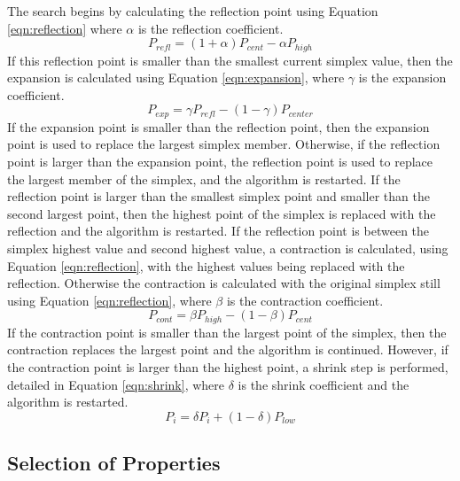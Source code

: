 \documentclass[pdflatex,sn-mathphys]{sn-jnl}
\begin{document}
	The search begins by calculating the reflection point using Equation \ref{eqn:reflection} where $\alpha$ is the reflection coefficient.
		\begin{equation}\label{eqn:reflection}
			P_{refl} = (1 + \alpha) P_{cent} - \alpha P_{high}
		\end{equation}
	If this reflection point is smaller than the smallest current simplex value, then the expansion is calculated using Equation \ref{eqn:expansion}, where $\gamma$ is the expansion coefficient.
		\begin{equation}\label{eqn:expansion}
			P_{exp} = \gamma P_{refl} - (1 - \gamma) P_{center}
		\end{equation}
	If the expansion point is smaller than the reflection point, then the expansion point is used to replace the largest simplex member.  Otherwise, if the reflection point is larger than the expansion point, the reflection point is used to replace the largest member of the simplex, and the algorithm is restarted.
	If the reflection point is larger than the smallest simplex point and smaller than the second largest point, then the highest point of the simplex is replaced with the reflection and the algorithm is restarted. 
	If the reflection point is between the simplex highest value and second highest value, a contraction is calculated, using Equation \ref{eqn:reflection}, with the highest values being replaced with the reflection.  Otherwise the contraction is calculated with the original simplex still using Equation \ref{eqn:reflection}, where $\beta$ is the contraction coefficient.
		\begin{equation}\label{eqn:contraction}
			P_{cont} = \beta P_{high} - (1 - \beta) P_{cent}	
		\end{equation}
	If the contraction point is smaller than the largest point of the simplex, then the contraction replaces the largest point and the algorithm is continued.
	However, if the contraction point is larger than the highest point, a shrink step is performed, detailed in Equation \ref{eqn:shrink}, where $\delta$ is the shrink coefficient and the algorithm is restarted.
		\begin{equation}\label{eqn:shrink}
			P_{i} = \delta P_{i} + (1 - \delta) P_{low}
		\end{equation}


	\subsection{Selection of Properties}
	\label{sensetivity_results}
\end{document}
